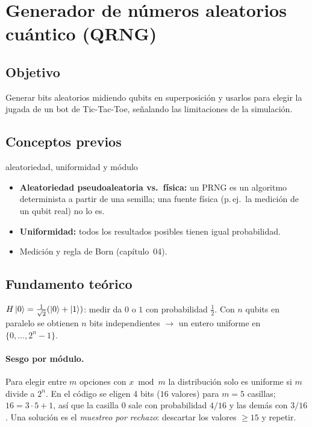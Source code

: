 \def\tituloconcepto{Generador de números aleatorios cuántico}


\section{Generador de números aleatorios cuántico (QRNG)}

\subsection{Objetivo}
Generar bits aleatorios midiendo qubits en superposición y usarlos para
elegir la jugada de un bot de Tic-Tac-Toe, señalando las limitaciones de la
simulación.

\subsection{Conceptos previos}
\begin{concepto}{aleatoriedad, uniformidad y módulo}
\begin{itemize}
  \item \textbf{Aleatoriedad pseudoaleatoria vs.\ física:} un PRNG es un
    algoritmo determinista a partir de una semilla; una fuente física
    (p.\,ej.\ la medición de un qubit real) no lo es.
  \item \textbf{Uniformidad:} todos los resultados posibles tienen igual
    probabilidad.
  \item Medición y regla de Born (capítulo~04).
\end{itemize}
\end{concepto}

\subsection{Fundamento teórico}
$H\left|0\right\rangle=\tfrac1{\sqrt2}(\left|0\right\rangle+\left|1\right\rangle)$: medir da $0$ o $1$ con probabilidad
$\tfrac12$. Con $n$ qubits en paralelo se obtienen $n$ bits independientes
$\to$ un entero uniforme en $\{0,\dots,2^n-1\}$.

\paragraph{Sesgo por módulo.} Para elegir entre $m$ opciones con $x\bmod m$ la
distribución solo es uniforme si $m$ divide a $2^n$. En el código se eligen 4
bits ($16$ valores) para $m=5$ casillas; $16=3\cdot5+1$, así que la casilla
$0$ sale con probabilidad $4/16$ y las demás con $3/16$. Una solución es el
\emph{muestreo por rechazo}: descartar los valores $\ge 15$ y repetir.

